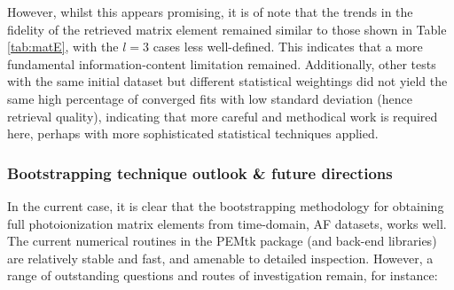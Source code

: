\documentclass[10pt]{article}
\begin{document}
However, whilst this appears promising, it is of note that the trends in the fidelity of the retrieved matrix element remained similar to those shown in Table \ref{tab:matE}, with the $l=3$ cases less well-defined. This indicates that a more fundamental information-content limitation remained. Additionally, other tests with the same initial dataset but different statistical weightings did not yield the same high percentage of converged fits with low standard deviation (hence retrieval quality), indicating that more careful and methodical work is required here, perhaps with more sophisticated statistical techniques applied.





\subsubsection{Bootstrapping technique outlook \& future directions}

In the current case, it is clear that the bootstrapping methodology for obtaining full photoionization matrix elements from time-domain, AF datasets, works well. The current numerical routines in the PEMtk package (and back-end libraries) are relatively stable and fast, and amenable to detailed inspection. However, a range of outstanding questions and routes of investigation remain, for instance:
\end{document}
